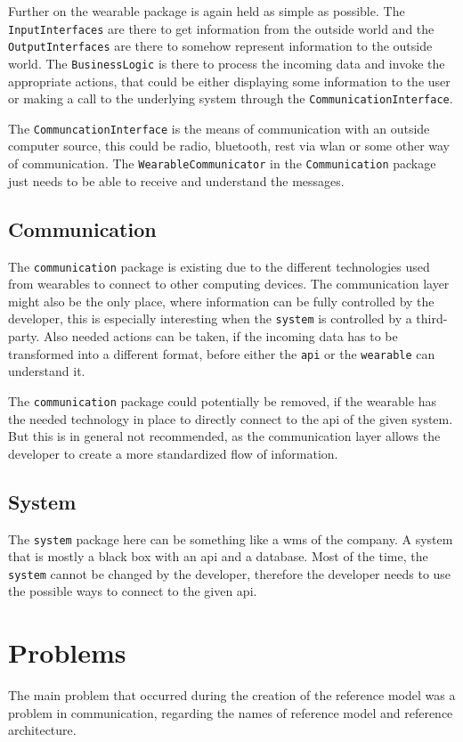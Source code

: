 Further on the wearable package is again held as simple as possible. The \texttt{InputInterfaces} are there to get information from the outside world and the \texttt{OutputInterfaces} are there to somehow represent information to the outside world. The \texttt{BusinessLogic} is there to process the incoming data and invoke the appropriate actions, that could be either displaying some information to the user or making a call to the underlying system through the \texttt{CommunicationInterface}.

The \texttt{CommuncationInterface} is the means of communication with an outside computer source, this could be radio, bluetooth, \gls{rest} via \gls{wlan} or some other way of communication. The \texttt{WearableCommunicator} in the \texttt{Communication} package just needs to be able to receive and understand the messages.
\subsection{Communication}
The \texttt{communication} package is existing due to the different technologies used from \gls{wearable}s to connect to other computing devices. The communication layer might also be the only place, where information can be fully controlled by the developer, this is especially interesting when the \texttt{system} is controlled by a third-party. Also needed actions can be taken, if the incoming data has to be transformed into a different format, before either the \texttt{\gls{api}} or the \texttt{wearable} can understand it. 

The \texttt{communication} package could potentially be removed, if the wearable has the needed technology in place to directly connect to the \gls{api} of the given system. But this is in general not recommended, as the communication layer allows the developer to create a more standardized flow of information.

\subsection{System}
The \texttt{system} package here can be something like a \gls{wms} of the company. A system that is mostly a black box with an \gls{api} and a database. Most of the time, the \texttt{system} cannot be changed by the developer, therefore the developer needs to use the possible ways to connect to the given \gls{api}.


\section{Problems}
The main problem that occurred during the creation of the \gls{reference model} was a problem in communication, regarding the names of \gls{reference model} and \gls{reference architecture}. 